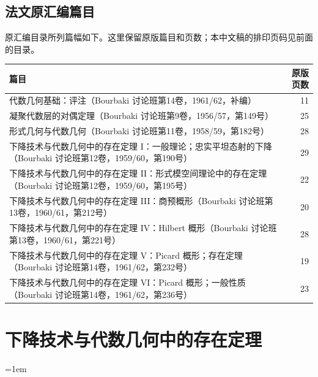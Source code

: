 \documentclass[a4paper,oneside,fleqn]{book}
\begin{document}
\chapter*{法文原汇编篇目}
原汇编目录所列篇幅如下。这里保留原版篇目和页数；本中文稿的排印页码见前面的目录。
\begin{center}
\begin{tabular}{p{}r}
篇目 & 原版页数\\\hline
代数几何基础：评注（Bourbaki 讨论班第14卷，1961/62，补编） & 11\\
凝聚代数层的对偶定理（Bourbaki 讨论班第9卷，1956/57，第149号） & 25\\
形式几何与代数几何（Bourbaki 讨论班第11卷，1958/59，第182号） & 28\\
下降技术与代数几何中的存在定理 I：一般理论；忠实平坦态射的下降（Bourbaki 讨论班第12卷，1959/60，第190号） & 29\\
下降技术与代数几何中的存在定理 II：形式模空间理论中的存在定理（Bourbaki 讨论班第12卷，1959/60，第195号） & 22\\
下降技术与代数几何中的存在定理 III：商预概形（Bourbaki 讨论班第13卷，1960/61，第212号） & 20\\
下降技术与代数几何中的存在定理 IV：Hilbert 概形（Bourbaki 讨论班第13卷，1960/61，第221号） & 28\\
下降技术与代数几何中的存在定理 V：Picard 概形；存在定理（Bourbaki 讨论班第14卷，1961/62，第232号） & 19\\
下降技术与代数几何中的存在定理 VI：Picard 概形；一般性质（Bourbaki 讨论班第14卷，1961/62，第236号） & 23
\end{tabular}
\end{center}
\mainmatter
\pagestyle{fancy}
\setcounter{part}{-1}
\renewcommand\thepart{}
\renewcommand\fgaAnchorPrefix{fga-foreword}

\clearpage
\renewcommand\thepart{\arabic{part}}
\renewcommand\fgaAnchorPrefix{fga1}

\clearpage
\setcounter{chapter}{0}
\renewcommand\fgaAnchorPrefix{fga2}

\clearpage
\renewcommand\fgaAnchorPrefix{fga3}
\part{下降技术与代数几何中的存在定理}
\setcounter{part}{0}
\renewcommand\thepart{3.\Roman{part}}
\setcounter{chapter}{0}
\renewcommand\thechapter{\Alph{chapter}}
\renewcommand\thesubsection{\thesection.\alph{subsection}}
\renewcommand\fgaAnchorPrefix{fga3.i}

\clearpage
\setcounter{chapter}{0}
\renewcommand\fgaAnchorPrefix{fga3.ii}

\clearpage
\setcounter{chapter}{-1}
\renewcommand\thechapter{\arabic{chapter}}
\renewcommand\fgaAnchorPrefix{fga3.iii}

\clearpage
\setcounter{chapter}{-1}
\renewcommand\fgaAnchorPrefix{fga3.iv}

\clearpage
\setcounter{chapter}{0}
\renewcommand\fgaAnchorPrefix{fga3.v}

\clearpage
\setcounter{chapter}{-1}
\renewcommand\fgaAnchorPrefix{fga3.vi}

\backmatter
\pagestyle{plain}
\nocite{*}
\begingroup
\emergencystretch=1em
\printbibliography[heading=bibintoc,title=参考文献]
\endgroup
\end{document}
